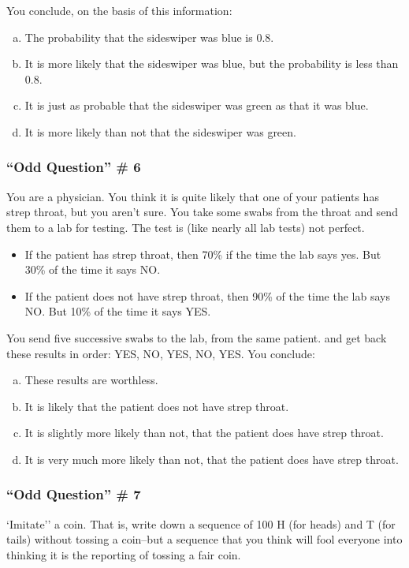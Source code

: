 \documentclass[handout]{beamer}
\begin{document}
\begin{singlespace}
\begin{frame}
	You conclude, on the basis of this information:
		\begin{enumerate}[(a)]
			\item The probability that the sideswiper was blue is 0.8.
			\item It is more likely that the sideswiper was blue, but the probability is less than 0.8. 
			\item It is just as probable that the sideswiper was green as that it was blue. 
			\item It is more likely than not that the sideswiper was green.
		\end{enumerate}
\end{frame}

\begin{frame}
\frametitle{``Odd Question'' \# 6}
\small
You are a physician. You think it is quite likely that one of your patients has strep throat, but you aren't sure. You take some swabs from the throat and send them to a lab for testing. The test is (like nearly all lab tests) not perfect. 
	\begin{itemize}
		\item If the patient has strep throat, then 70\% if the time the lab says yes. But 30\% of the time it says NO.
		\item If the patient does not have strep throat, then 90\% of the time the lab says NO. But 10\% of the time it says YES.
	\end{itemize}
	You send five successive swabs to the lab, from the same patient. and get back these results in order: YES, NO, YES, NO, YES. You conclude:
		\begin{enumerate}[(a)]
			\item These results are worthless.
			\item It is likely that the patient does not have strep throat.
			\item It is slightly more likely than not, that the patient does have strep throat.
			\item It is very much more likely than not, that the patient does have strep throat.
		\end{enumerate}
\end{frame}


\end{singlespace}
\begin{frame}
\frametitle{``Odd Question'' \# 7}
\normalsize
`Imitate'' a coin. That is, write down a sequence of 100 H (for heads) and T (for tails) without tossing a coin--but a sequence that you think will fool everyone into thinking it is the reporting of tossing a fair coin.
		
\end{frame}
\end{document}
